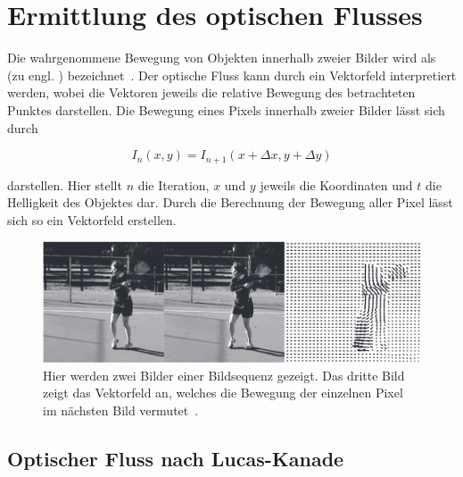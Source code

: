 
\chapter{Ermittlung des optischen Flusses}


Die wahrgenommene Bewegung von Objekten innerhalb zweier Bilder wird als  (zu engl. ) bezeichnet~\cite[S.~939]{ Russell2010}.
Der optische Fluss kann durch ein Vektorfeld interpretiert werden, wobei die Vektoren jeweils die relative Bewegung des betrachteten Punktes darstellen.
Die Bewegung eines Pixels innerhalb zweier Bilder lässt sich durch

\begin{equation}
    I_n(x, y) = I_{n+1}(x + \Delta x, y + \Delta y)
    \label{eq:optical_flow}
\end{equation}

darstellen.
Hier stellt $n$ die Iteration, $x$ und $y$ jeweils die Koordinaten und $t$ die Helligkeit des Objektes dar.
Durch die Berechnung der Bewegung aller Pixel lässt sich so ein Vektorfeld erstellen.

\begin{figure}
    \centering
    \includegraphics[width=\textwidth]{gfx/ai_modern_approach_optical_flow.png}
    \caption[Vektorfelder durch optischen Fluss.]{Hier werden zwei Bilder einer Bildsequenz gezeigt. Das dritte Bild zeigt das Vektorfeld an, welches die Bewegung der einzelnen Pixel im nächsten Bild vermutet~\cites[S.~941]{Russell2010}{Brox2009}.}
    \label{fig:ai_modern_approach_optical_flow}
\end{figure}

\section{Optischer Fluss nach Lucas-Kanade}\label{ch:lucas_kanade}

